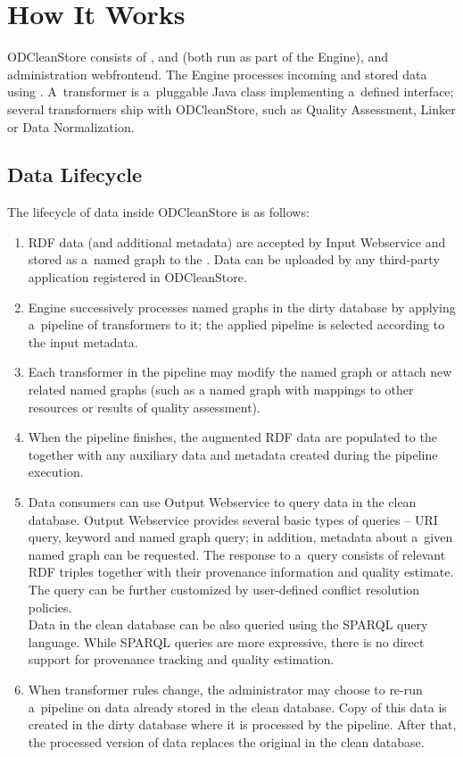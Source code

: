 \chapter{How It Works}
\label{chap:howItWorks}

ODCleanStore consists of ,  and  (both run as part of the Engine), and administration webfrontend. The Engine processes incoming and stored data using . A~transformer is a~pluggable Java class implementing a~defined interface; several transformers ship with ODCleanStore, such as Quality Assessment, Linker or Data Normalization.

\section{Data Lifecycle}

The lifecycle of data inside ODCleanStore is as follows:

\begin{enumerate}
  \item RDF data (and additional metadata) are accepted by Input Webservice and stored as a~named graph to the . Data can be uploaded by any third-party application registered in ODCleanStore.
  \item Engine successively processes named graphs in the dirty database by applying a~pipeline of transformers to it; the applied pipeline is selected according to the input metadata.
  \item Each transformer in the pipeline may modify the named graph or attach new related named graphs (such as a named graph with mappings to other resources or results of quality assessment).
  \item When the pipeline finishes, the augmented RDF data are populated to the  together with any auxiliary data and metadata created during the pipeline execution.
  \item Data consumers can use Output Webservice to query data in the clean database. Output Webservice provides several basic types of queries -- URI query, keyword and named graph query; in addition, metadata about a~given named graph can be requested. The response to a~query consists of relevant RDF triples together with their provenance information and quality estimate. The query can be further customized by user-defined conflict resolution policies.\\
	Data in the clean database can be also queried using the SPARQL query language. While SPARQL queries are more expressive, there is no direct support for provenance tracking and quality estimation. 
  \item When transformer rules change, the administrator may choose to re-run a~pipeline on data already stored in the clean database. Copy of this data is created in the dirty database where it is processed by the pipeline. After that, the processed version of data replaces the original in the clean database.
\end{enumerate}

